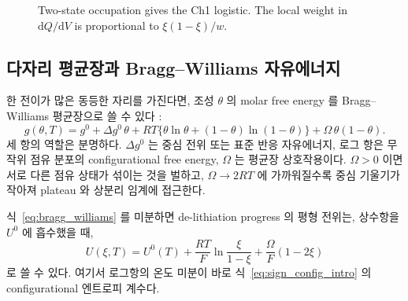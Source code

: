 \documentclass[11pt,a4paper]{article}
\newcommand{\dd}{\mathrm{d}}
\newcommand{\eq}{\mathrm{eq}}
\begin{document}
\begin{figure}[t]
\centering
{}
\caption{Two-state occupation gives the Ch1 logistic. The local weight in
$\dd Q/\dd V$ is proportional to $\xi(1-\xi)/w$.}
\label{fig:logistic_distribution}
\end{figure}

\subsection{다자리 평균장과 Bragg--Williams 자유에너지}
한 전이가 많은 동등한 자리를 가진다면, 조성 $\theta$ 의 molar free energy 를
Bragg--Williams 평균장으로 쓸 수 있다 \cite{huggins1941,bazant2013,newman}:
\begin{equation}
g(\theta,T)=g^0+\Delta g^0\,\theta
  +RT\{\theta\ln\theta+(1-\theta)\ln(1-\theta)\}
  +\Omega\,\theta(1-\theta).
\label{eq:bragg_williams}
\end{equation}
세 항의 역할은 분명하다. $\Delta g^0$ 는 중심 전위 또는 표준 반응 자유에너지, 로그 항은
무작위 점유 분포의 configurational free energy, $\Omega$ 는 평균장 상호작용이다. $\Omega>0$ 이면
서로 다른 점유 상태가 섞이는 것을 벌하고, $\Omega\rightarrow2RT$ 에 가까워질수록 중심 기울기가
작아져 plateau 와 상분리 임계에 접근한다.

식~\eqref{eq:bragg_williams} 를 미분하면 de-lithiation progress 의 평형 전위는, 상수항을 $U^0$ 에
흡수했을 때,
\begin{equation}
U(\xi,T)
=U^0(T)+\frac{RT}{F}\ln\frac{\xi}{1-\xi}
  +\frac{\Omega}{F}(1-2\xi)
\label{eq:regular_solution_ocv}
\end{equation}
로 쓸 수 있다. 여기서 로그항의 온도 미분이 바로 식~\eqref{eq:sign_config_intro} 의 configurational
엔트로피 계수다.
\end{document}
